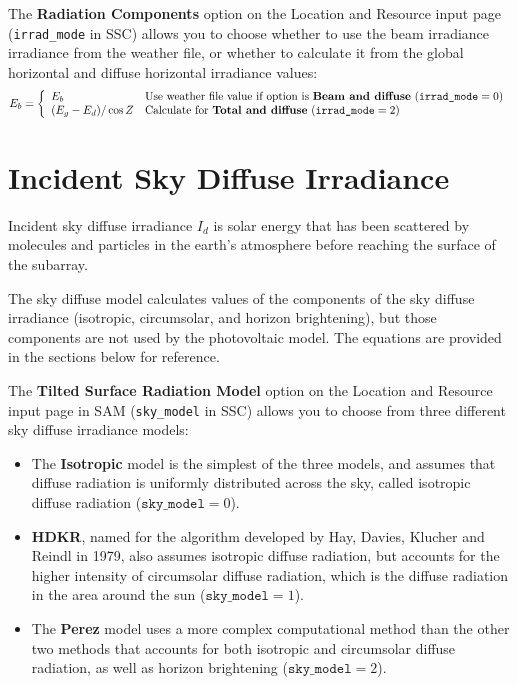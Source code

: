 \documentclass[12pt,letterpaper]{article}
\begin{document}
The \textbf{Radiation Components} option on the Location and Resource input page (\texttt{irrad\_mode} in SSC) allows you to choose whether to use the beam irradiance  irradiance from the weather file, or whether to calculate it from the global horizontal and diffuse horizontal irradiance values:
\begin{equation}\label{eqn-beam}
E_b = \left\{
\begin{array}{ll}
E_b & \text{Use weather file value if option is \textbf{Beam and diffuse} ($\texttt{irrad\_mode}=0)$}\\
(E_g - E_d)/\cos Z & \text{Calculate for \textbf{Total and diffuse} ($\texttt{irrad\_mode}=2)$}
\end{array}
\right.
\end{equation}

\section{Incident Sky Diffuse Irradiance}

Incident sky diffuse irradiance $I_d$ is solar energy that has been scattered by molecules and particles in the earth's atmosphere before reaching the surface of the subarray.

The sky diffuse model calculates values of the components of the sky diffuse irradiance (isotropic, circumsolar, and horizon brightening), but those components are not used by the photovoltaic model. The equations are provided in the sections below for reference.%

The \textbf{Tilted Surface Radiation Model} option on the Location and Resource input page in SAM (\texttt{sky\_model} in SSC) allows you to choose from three different sky diffuse irradiance models:

\begin{itemize}
\item The \textbf{Isotropic} model is the simplest of the three models, and assumes that diffuse radiation is uniformly distributed across the sky, called isotropic diffuse radiation ($\mathtt{sky\_model} = 0$).
\item \textbf{HDKR}, named for the algorithm developed by Hay, Davies, Klucher and Reindl in 1979, also assumes isotropic diffuse radiation, but accounts for the higher intensity of circumsolar diffuse radiation, which is the diffuse radiation in the area around the sun ($\mathtt{sky\_model} = 1$).
\item The \textbf{Perez} model uses a more complex computational method than the other two methods that accounts for both isotropic and circumsolar diffuse radiation, as well as horizon brightening ($\mathtt{sky\_model} = 2$). 
\end{itemize}
\end{document}
